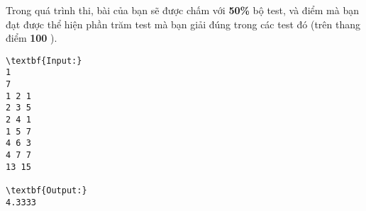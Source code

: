 Trong quá trình thi, bài của bạn sẽ được chấm với   \textbf{    50\%   }   bộ test, và điểm mà bạn đạt được thể hiện phần trăm test mà bạn giải đúng trong các test đó (trên thang điểm   \textbf{    100   }   ).
\begin{verbatim}
\textbf{Input:}
1
7
1 2 1
2 3 5
2 4 1
1 5 7
4 6 3
4 7 7
13 15

\textbf{Output:}
4.3333

\end{verbatim}